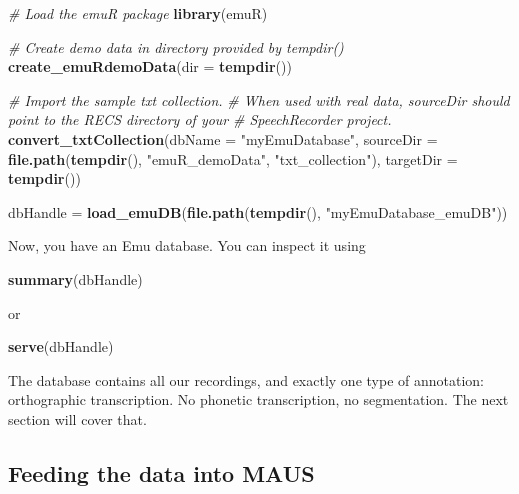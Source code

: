 \documentclass[]{book}
\newenvironment{Shaded}{\begin{snugshade}}{\end{snugshade}}
\newcommand{\KeywordTok}[1]{\textcolor[rgb]{0.13,0.29,0.53}{\textbf{{#1}}}}
\newcommand{\DataTypeTok}[1]{\textcolor[rgb]{0.13,0.29,0.53}{{#1}}}
\newcommand{\StringTok}[1]{\textcolor[rgb]{0.31,0.60,0.02}{{#1}}}
\newcommand{\CommentTok}[1]{\textcolor[rgb]{0.56,0.35,0.01}{\textit{{#1}}}}
\newcommand{\NormalTok}[1]{{#1}}
\theoremstyle{definition}
\theoremstyle{definition}
\theoremstyle{definition}
\theoremstyle{remark}
\begin{document}
\begin{Shaded}
\begin{Highlighting}[]
\CommentTok{# Load the emuR package}
\KeywordTok{library}\NormalTok{(emuR)}

\CommentTok{# Create demo data in directory provided by tempdir()}
\KeywordTok{create_emuRdemoData}\NormalTok{(}\DataTypeTok{dir =} \KeywordTok{tempdir}\NormalTok{())}

\CommentTok{# Import the sample txt collection.}
\CommentTok{# When used with real data, sourceDir should point to the RECS directory of your}
\CommentTok{# SpeechRecorder project.}
\KeywordTok{convert_txtCollection}\NormalTok{(}\DataTypeTok{dbName =} \StringTok{"myEmuDatabase"}\NormalTok{,}
                      \DataTypeTok{sourceDir =} \KeywordTok{file.path}\NormalTok{(}\KeywordTok{tempdir}\NormalTok{(), }\StringTok{"emuR_demoData"}\NormalTok{, }\StringTok{"txt_collection"}\NormalTok{),}
                      \DataTypeTok{targetDir =} \KeywordTok{tempdir}\NormalTok{())}

\NormalTok{dbHandle =}\StringTok{ }\KeywordTok{load_emuDB}\NormalTok{(}\KeywordTok{file.path}\NormalTok{(}\KeywordTok{tempdir}\NormalTok{(), }\StringTok{"myEmuDatabase_emuDB"}\NormalTok{))}
\end{Highlighting}
\end{Shaded}

Now, you have an Emu database. You can inspect it using

\begin{Shaded}
\begin{Highlighting}[]
\KeywordTok{summary}\NormalTok{(dbHandle)}
\end{Highlighting}
\end{Shaded}

or

\begin{Shaded}
\begin{Highlighting}[]
\KeywordTok{serve}\NormalTok{(dbHandle)}
\end{Highlighting}
\end{Shaded}

The database contains all our recordings, and exactly one type of
annotation: orthographic transcription. No phonetic transcription, no
segmentation. The next section will cover that.

\subsection{Feeding the data into
MAUS}\label{feeding-the-data-into-maus}
\end{document}
